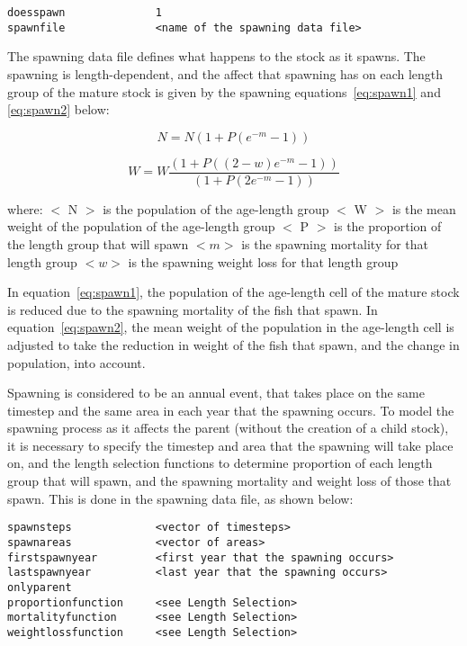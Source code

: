\documentclass[10pt,twoside]{book}
\begin{document}
{\small\begin{verbatim}
doesspawn              1
spawnfile              <name of the spawning data file>
\end{verbatim}}

The spawning data file defines what happens to the stock as it spawns.  The spawning is length-dependent, and the affect that spawning has on each length group of the mature stock is given by the spawning equations~\ref{eq:spawn1} and \ref{eq:spawn2} below:

\begin{equation}\label{eq:spawn1}
N = N {\left(1 + P {(e^{-m} - 1)}\right)}
\end{equation}

\begin{equation}\label{eq:spawn2}
W = W \frac{\left(1 + P {((2 - w)e^{-m} - 1)}\right)}{\left(1 + P {(2e^{-m} - 1)}\right)}
\end{equation}

where:\newline
$<$ N $>$ is the population of the age-length group\newline
$<$ W $>$ is the mean weight of the population of the age-length group\newline
$<$ P $>$ is the proportion of the length group that will spawn\newline
$<m>$ is the spawning mortality for that length group\newline
$<w>$ is the spawning weight loss for that length group

\bigskip
In equation~\ref{eq:spawn1}, the population of the age-length cell of the mature stock is reduced due to the spawning mortality of the fish that spawn.  In equation~\ref{eq:spawn2}, the mean weight of the population in the age-length cell is adjusted to take the reduction in weight of the fish that spawn, and the change in population, into account.

\bigskip
Spawning is considered to be an annual event, that takes place on the same timestep and the same area in each year that the spawning occurs.  To model the spawning process as it affects the parent (without the creation of a child stock), it is necessary to specify the timestep and area that the spawning will take place on, and the length selection functions to determine proportion of each length group that will spawn, and the spawning mortality and weight loss of those that spawn.  This is done in the spawning data file, as shown below:

{\small\begin{verbatim}
spawnsteps             <vector of timesteps>
spawnareas             <vector of areas>
firstspawnyear         <first year that the spawning occurs>
lastspawnyear          <last year that the spawning occurs>
onlyparent
proportionfunction     <see Length Selection>
mortalityfunction      <see Length Selection>
weightlossfunction     <see Length Selection>
\end{verbatim}}
\end{document}
